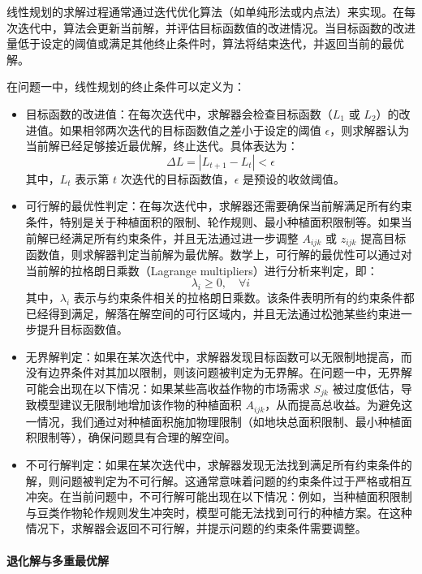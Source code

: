 \documentclass[12pt,a4paper]{nmmcm}
\begin{document}
线性规划的求解过程通常通过迭代优化算法（如单纯形法或内点法）来实现。在每次迭代中，算法会更新当前解，并评估目标函数值的改进情况。当目标函数的改进量低于设定的阈值或满足其他终止条件时，算法将结束迭代，并返回当前的最优解。

在问题一中，线性规划的终止条件可以定义为：
\begin{itemize}
    \item 目标函数的改进值：在每次迭代中，求解器会检查目标函数（$L_1$ 或 $L_2$）的改进值。如果相邻两次迭代的目标函数值之差小于设定的阈值 $\epsilon$，则求解器认为当前解已经足够接近最优解，终止迭代。具体表达为：
    \[
    \Delta L = |L_{t+1} - L_t| < \epsilon
    \]
    其中，$L_t$ 表示第 $t$ 次迭代的目标函数值，$\epsilon$ 是预设的收敛阈值。

    \item 可行解的最优性判定：在每次迭代中，求解器还需要确保当前解满足所有约束条件，特别是关于种植面积的限制、轮作规则、最小种植面积限制等。如果当前解已经满足所有约束条件，并且无法通过进一步调整 $A_{ijk}$ 或 $z_{ijk}$ 提高目标函数值，则求解器判定当前解为最优解。数学上，可行解的最优性可以通过对当前解的拉格朗日乘数（Lagrange multipliers）进行分析来判定，即：
    \[
    \lambda_i \geq 0, \quad \forall i
    \]
    其中，$\lambda_i$ 表示与约束条件相关的拉格朗日乘数。该条件表明所有的约束条件都已经得到满足，解落在解空间的可行区域内，并且无法通过松弛某些约束进一步提升目标函数值。

    \item 无界解判定：如果在某次迭代中，求解器发现目标函数可以无限制地提高，而没有边界条件对其加以限制，则该问题被判定为无界解。在问题一中，无界解可能会出现在以下情况：如果某些高收益作物的市场需求 $S_{jk}$ 被过度低估，导致模型建议无限制地增加该作物的种植面积 $A_{ijk}$，从而提高总收益。为避免这一情况，我们通过对种植面积施加物理限制（如地块总面积限制、最小种植面积限制等），确保问题具有合理的解空间。

    \item 不可行解判定：如果在某次迭代中，求解器发现无法找到满足所有约束条件的解，则问题被判定为不可行解。这通常意味着问题的约束条件过于严格或相互冲突。在当前问题中，不可行解可能出现在以下情况：例如，当种植面积限制与豆类作物轮作规则发生冲突时，模型可能无法找到可行的种植方案。在这种情况下，求解器会返回不可行解，并提示问题的约束条件需要调整。
\end{itemize}

\paragraph{退化解与多重最优解}
\end{document}

